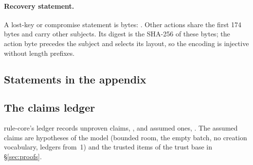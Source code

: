 \paragraph{Recovery statement.} A lost-key or compromise statement is
 bytes: . Other
actions share the first 174 bytes and carry other subjects. Its digest is the
SHA-256 of these bytes; the action byte precedes the subject and selects its
layout, so the encoding is injective without length prefixes.

\subsection{Statements in the appendix}







\subsection{The claims ledger}

rule-core's ledger records  unproven claims,
, and  assumed ones,
. The assumed claims are hypotheses of the model
(bounded room, the empty batch, no creation vocabulary, ledgers from~1) and the
trusted items of the trust base in \S\ref{sec:proofs}.
